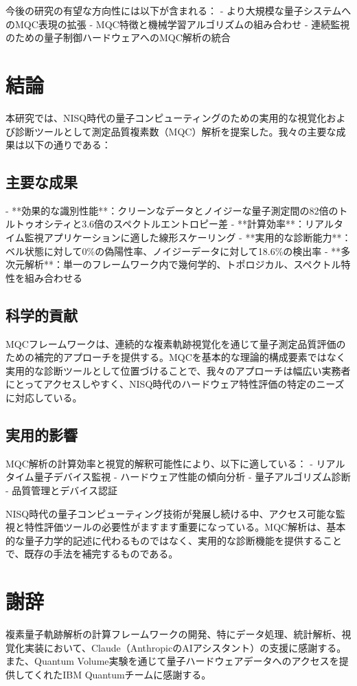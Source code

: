 \documentclass[a4paper,11pt]{article}
\begin{document}
\begin{CJK}{UTF8}{min}
今後の研究の有望な方向性には以下が含まれる：
- より大規模な量子システムへのMQC表現の拡張
- MQC特徴と機械学習アルゴリズムの組み合わせ
- 連続監視のための量子制御ハードウェアへのMQC解析の統合

\section{結論}

本研究では、NISQ時代の量子コンピューティングのための実用的な視覚化および診断ツールとして測定品質複素数（MQC）解析を提案した。我々の主要な成果は以下の通りである：

\subsection{主要な成果}

- **効果的な識別性能**：クリーンなデータとノイジーな量子測定間の82倍のトルトゥオシティと3.6倍のスペクトルエントロピー差
- **計算効率**：リアルタイム監視アプリケーションに適した線形スケーリング
- **実用的な診断能力**：ベル状態に対して0\%の偽陽性率、ノイジーデータに対して18.6\%の検出率
- **多次元解析**：単一のフレームワーク内で幾何学的、トポロジカル、スペクトル特性を組み合わせる

\subsection{科学的貢献}

MQCフレームワークは、連続的な複素軌跡視覚化を通じて量子測定品質評価のための補完的アプローチを提供する。MQCを基本的な理論的構成要素ではなく実用的な診断ツールとして位置づけることで、我々のアプローチは幅広い実務者にとってアクセスしやすく、NISQ時代のハードウェア特性評価の特定のニーズに対応している。

\subsection{実用的影響}

MQC解析の計算効率と視覚的解釈可能性により、以下に適している：
- リアルタイム量子デバイス監視
- ハードウェア性能の傾向分析
- 量子アルゴリズム診断
- 品質管理とデバイス認証

NISQ時代の量子コンピューティング技術が発展し続ける中、アクセス可能な監視と特性評価ツールの必要性がますます重要になっている。MQC解析は、基本的な量子力学的記述に代わるものではなく、実用的な診断機能を提供することで、既存の手法を補完するものである。

\section*{謝辞}

複素量子軌跡解析の計算フレームワークの開発、特にデータ処理、統計解析、視覚化実装において、Claude（AnthropicのAIアシスタント）の支援に感謝する。また、Quantum Volume実験を通じて量子ハードウェアデータへのアクセスを提供してくれたIBM Quantumチームに感謝する。

\end{CJK}
\end{document}
